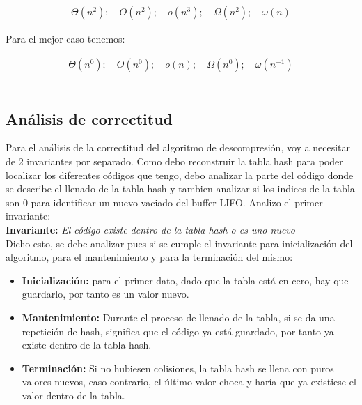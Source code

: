 \documentclass[letterpaper]{article}
\begin{document}
\begin{align*}
\Theta\left(n^2 \right);\quad O\left(n^2 \right);\quad o\left(n^3 \right);\quad \Omega\left(n^2 \right);\quad\omega\left(n \right)
\end{align*}

Para el mejor caso tenemos:

\begin{align*}
\Theta\left(n^0 \right);\quad O\left(n^0 \right);\quad o\left(n \right);\quad \Omega\left(n^0 \right);\quad\omega\left(n^{-1} \right)
\end{align*}
\\


\subsection{Análisis de correctitud}
Para el análisis de la correctitud del algoritmo de descompresión, voy a necesitar de 2 invariantes por separado. Como debo reconstruir la tabla hash para poder localizar los diferentes códigos que tengo, debo analizar la parte del código donde se describe el llenado de la tabla hash y tambien analizar si los indices de la tabla son 0 para identificar un nuevo vaciado del buffer LIFO. Analizo el primer invariante:\\

\textbf{Invariante:} \textit{El código existe dentro de la tabla hash o es uno nuevo}\\

Dicho esto, se debe analizar pues si se cumple el invariante para inicialización del algoritmo, para el mantenimiento y para la terminación del mismo:\\

\begin{itemize}
\item \textbf{Inicialización:} para el primer dato, dado que la tabla está en cero, hay que guardarlo, por tanto es un valor nuevo.

\item \textbf{Mantenimiento:} Durante el proceso de llenado de la tabla, si se da una repetición de hash, significa que el código ya está guardado, por tanto ya existe dentro de la tabla hash.

\item \textbf{Terminación:} Si no hubiesen colisiones, la tabla hash se llena con puros valores nuevos, caso contrario, el último valor choca y haría que ya existiese el valor dentro de la tabla.\\


\end{itemize}
\end{document}
